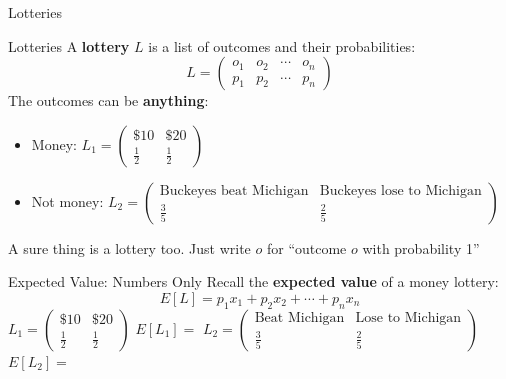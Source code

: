 
\begin{frame}[standout]
Lotteries
\end{frame}

\begin{frame}{Lotteries}
A \textbf{lottery} $L$ is a list of outcomes and their probabilities:
$$L=\begin{pmatrix} o_1 & o_2 & \cdots & o_n \\ p_1 & p_2 & \cdots & p_n\end{pmatrix}$$
\bsk
The outcomes can be \textbf{anything}:
\bsk
\begin{itemize}
    \item Money: \hspace{0.45in}
      $L_1=\begin{pmatrix} \$10 & \$20 \\[2pt] \tfrac12 & \tfrac12\end{pmatrix}$
      \vspace{0.2in}
    \item Not money: \hspace{0.2in}
      $L_2=\begin{pmatrix} \text{Buckeyes beat Michigan} & \text{Buckeyes lose to Michigan} \\[2pt] \tfrac35 & \tfrac25\end{pmatrix}$
\end{itemize}
\vfill
A sure thing is a lottery too. Just write $o$ for ``outcome $o$ with probability 1''
\vspace{-0.3in}
\end{frame}

\begin{frame}{Expected Value: Numbers Only}
Recall the \textbf{expected value} of a money lottery:
$$E[L] = p_1x_1 + p_2x_2 + \cdots + p_nx_n$$
\bsk
$L_1=\begin{pmatrix} \$10 & \$20 \\[2pt] \tfrac12 & \tfrac12\end{pmatrix}$
\hspace{0.3in} $E[L_1]=$ \underline{\hspace{1.5in}}
\bsk
$L_2=\begin{pmatrix} \text{Beat Michigan} & \text{Lose to Michigan} \\[2pt] \tfrac35 & \tfrac25\end{pmatrix}$
\hspace{0.3in} $E[L_2]=$ 
\vfill
{}
\vspace{-0.3in}
\end{frame}


